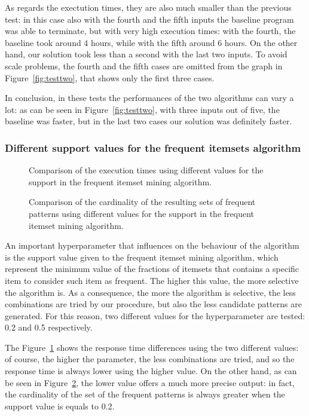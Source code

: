 \documentclass{acm_proc_article-sp-sigmod09}
\begin{document}
As regards the exectution times, they are also much smaller than the previous test: in this case also with the fourth and the fifth inputs the baseline program was able to terminate, but with very high execution times: with the fourth, the baseline took around 4 hours, while with the fifth around 6 hours. On the other hand, our solution took less than a second with the last two inputs. To avoid scale problems, the fourth and the fifth cases are omitted from the graph in Figure~\ref{fig:testtwo}, that shows only the first three cases. 

In conclusion, in these tests the performances of the two algorithms can vary a lot: as can be seen in Figure~\ref{fig:testtwo}, with three inputs out of five, the baseline was faster, but in the last two cases our solution was definitely faster.

\subsubsection{Different support values for the frequent itemsets algorithm}

\begin{figure}
\centering
{}
\caption{Comparison of the execution times using different values for the support in the frequent itemset mining algorithm.}
\label{fig:test3}
\end{figure}

\begin{figure}
\centering
{}
\caption{Comparison of the cardinality of the resulting sets of frequent patterns using different values for the support in the frequent itemset mining algorithm.}
\label{fig:test4}
\end{figure}

An important hyperparameter that influences on the behaviour of the algorithm is the support value given to the frequent itemset mining algorithm, which represent the minimum value of the fractions of itemsets that contains a specific item to consider such item as frequent. The higher this value, the more selective the algorithm is. As a consequence, the more the algorithm is selective, the less combinations are tried by our procedure, but also the less candidate patterns are generated. For this reason, two different values for the hyperparameter are tested: 0.2 and 0.5 respectively.

The Figure~\ref{fig:test3} shows the response time differences using the two different values: of course, the higher the parameter, the less combinations are tried, and so the response time is always lower using the higher value. On the other hand, as can be seen in Figure~\ref{fig:test4}, the lower value offers a much more precise output: in fact, the cardinality of the set of the frequent patterns is always greater when the support value is equals to 0.2.
\end{document}
